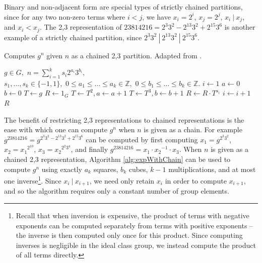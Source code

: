 \documentclass{ucalgthes1}
\theoremstyle{definition}
\newcommand{\ZZ}{\mathbb{Z}}
\begin{document}
\noindent
Binary and non-adjacent form are special types of strictly chained partitions, since for any two non-zero terms where $i < j$, we have $x_i = 2^i$, $x_j = 2^j$, $ x_i ~|~ x_j$, and $x_i < x_j$.  The 2,3 representation of $23814216 = 2^3 3^2 - 2^{13} 3^2 + 2^{15} 3^6$ is another example of a strictly chained partition, since $2^3 3^2 ~|~ 2^{13} 3^2 ~|~ 2^{15} 3^6$.

\begin{algorithm}[h]
\caption{Computes $g^n$ given $n$ as a chained 2,3 partition. Adapted from \cite{Dimitrov2005}.}
\label{alg:expWithChain}
\begin{algorithmic}[1]
\REQUIRE $g \in G,$ 
$n = \sum_{i=1}^k s_i2^{a_i}3^{b_i},$ \\
$s_1,...,s_k \in \{-1, 1\},$ 
$0 \le a_1 \le ...\le a_k \in \ZZ,$ 
$0 \le b_1 \le ... \le b_k \in \ZZ.$
\STATE $i \gets 1$
\STATE $a \gets 0$ 
\STATE $b \gets 0$ 
\STATE $T \gets g$ 
\STATE $R \gets 1_G$
		\STATE $T \gets T^2, a \gets a + 1$
	\ENDWHILE
		\STATE $T \gets T^3, b \gets b + 1$
	\ENDWHILE
	\STATE $R \gets R \cdot T^{s_i}$ 
	\STATE $i \gets i + 1$
\ENDWHILE
\RETURN $R$
\end{algorithmic}
\end{algorithm}

The benefit of restricting 2,3 representations to chained representations is the ease with which one can compute $g^n$ when $n$ is given as a chain.  For example $g^{23814216} = g^{2^3 3^2 - 2^{13} 3^2 + 2^{15} 3^6}$ can be computed by first computing $x_1 = g^{2^3 3^2}$, $x_2 = {x_1}^{2^{10}}$, $x_3 = {x_2}^{2^2 3^4}$, and finally $g^{23814216} = x_1 \cdot {x_2}^{-1} \cdot x_3$. When $n$ is given as a chained 2,3 representation, Algorithm \ref{alg:expWithChain} can be used to compute $g^n$ using exactly $a_k$ squares, $b_k$  cubes, $k-1$ multiplications, and at most one inverse\footnote{Recall that when inversion is expensive, the product of terms with negative exponents can be computed separately from terms with positive exponents -- the inverse is then computed only once for this product.  Since computing inverses is negligible in the ideal class group, we instead compute the product of all terms directly.}.  Since $x_i ~|~ x_{i+1}$, we need only retain $x_i$ in order to compute $x_{i+1}$, and so the algorithm requires only a constant number of group elements.  
\end{document}
